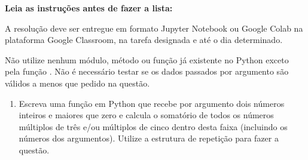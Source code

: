 
\vspace{1cm}

\noindent  \textbf{Leia as instruções antes de fazer a lista:}

\vspace{0.3cm}
\noindent A resolução deve ser entregue em formato Jupyter Notebook ou Google Colab na plataforma Google Classroom, na tarefa designada e até o dia determinado.

\noindent  Não utilize nenhum módulo, método ou função já existente no Python exceto pela função . Não é necessário testar se os dados passados por argumento são válidos a menos que pedido na questão.


\vspace{0.5cm}


\begin{enumerate}[label=\textbf{Q\arabic*.}]


  

    \item Escreva uma função em Python que recebe por argumento dois números inteiros e maiores que zero e calcula o somatório de todos os números múltiplos de três e/ou múltiplos de cinco dentro desta faixa (incluindo os números dos argumentos). Utilize a estrutura de repetição  para fazer a questão.

    

    \vspace{0.5cm}


\end{enumerate}
